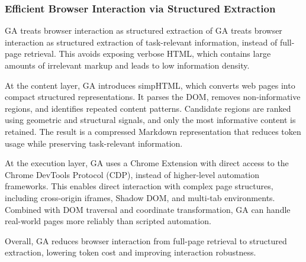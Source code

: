 \subsubsection{Efficient Browser Interaction via Structured Extraction}
GA treats browser interaction as structured extraction of GA treats browser interaction as structured extraction of task-relevant information, instead of full-page retrieval. This avoids exposing verbose HTML, which contains large amounts of irrelevant markup and leads to low information density.

At the content layer, GA introduces simpHTML, which converts web pages into compact structured representations. It parses the DOM, removes non-informative regions, and identifies repeated content patterns. Candidate regions are ranked using geometric and structural signals, and only the most informative content is retained. The result is a compressed Markdown representation that reduces token usage while preserving task-relevant information.

At the execution layer, GA uses a Chrome Extension with direct access to the Chrome DevTools Protocol (CDP), instead of higher-level automation frameworks. This enables direct interaction with complex page structures, including cross-origin iframes, Shadow DOM, and multi-tab environments. Combined with DOM traversal and coordinate transformation, GA can handle real-world pages more reliably than scripted automation.

Overall, GA reduces browser interaction from full-page retrieval to structured extraction, lowering token cost and improving interaction robustness.







